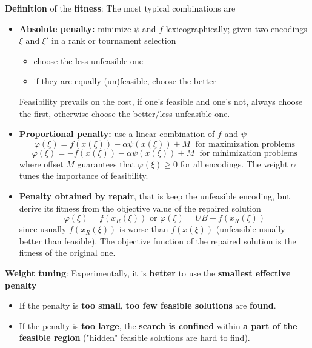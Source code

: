 \documentclass[11pt]{article}
\begin{document}
	\textbf{Definition} of the \textbf{fitness}: The most typical combinations are
	\begin{itemize}
		\item \textbf{Absolute penalty:} minimize $\psi$ and $f$ lexicographically; given two encodings $\xi$ and $\xi'$ in a rank or tournament selection
		\begin{itemize}
			\item choose the less unfeasible one
			\item if they are equally (un)feasible, choose the better
		\end{itemize}
		Feasibility prevails on the cost, if one's feasible and one's not, always choose the first, otherwise choose the better/less unfeasible one.\\
		
		\item \textbf{Proportional penalty:} use a linear combination of $f$ and $\psi$
		$$ \varphi (\xi) = f (x (\xi)) - \alpha \psi (x (\xi)) + M \; \text{ for maximization problems} $$
		$$ \varphi (\xi) = -f (x (\xi)) - \alpha \psi (x (\xi)) + M \; \text{ for minimization problems} $$
		where offset $M$ guarantees that $\varphi (\xi) \geq 0$ for all encodings. The weight $\alpha$ tunes the importance of feasibility.\\
		
		\item \textbf{Penalty obtained by repair}, that is keep the unfeasible encoding, but derive its fitness from the objective value of the repaired solution
		$$ \varphi (\xi) = f (x_R (\xi)) \text{ or } \varphi (\xi) = UB - f (x_R (\xi)) $$
		since usually $f (x_R (\xi))$ is worse than $f (x (\xi))$ (unfeasible usually better than feasible). The objective function of the repaired solution is the fitness of the original one.\\
	\end{itemize}
	
	\newpage
	
	\textbf{Weight tuning}: Experimentally, it is \textbf{better} to use the \textbf{smallest effective penalty}
	\begin{itemize}
		\item If the penalty is \textbf{too small}, \textbf{too few feasible solutions} are \textbf{found}.\\
		
		\item If the penalty is \textbf{too large}, the \textbf{search is confined} within \textbf{a part of the feasible region} ("hidden" feasible solutions are hard to find).\\
	\end{itemize}
	
\end{document}
